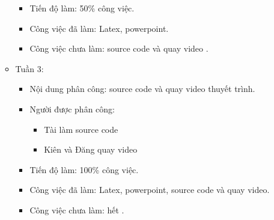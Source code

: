 \documentclass{article}
\begin{document}
\begin{itemize}
\begin{itemize}
\begin{itemize}
                    \item Tiến độ làm: 50\% công việc.
                    \item Công việc đã làm: Latex, powerpoint.
                    \item Công việc chưa làm: source code và quay video .
                \end{itemize}
            \item Tuần 3:
               \begin{itemize}
                    \item Nội dung phân công: source code và quay video thuyết trình.
                    \item Người được phân công:
                        \begin{itemize}
                            \item Tài làm source code
                            \item Kiên và Đăng quay video
                        \end{itemize}
                    \item Tiến độ làm: 100\% công việc.
                    \item Công việc đã làm: Latex, powerpoint, source code và quay video.
                    \item Công việc chưa làm: hết .
                \end{itemize}
        \end{itemize}
        
\end{itemize}
\end{document}
